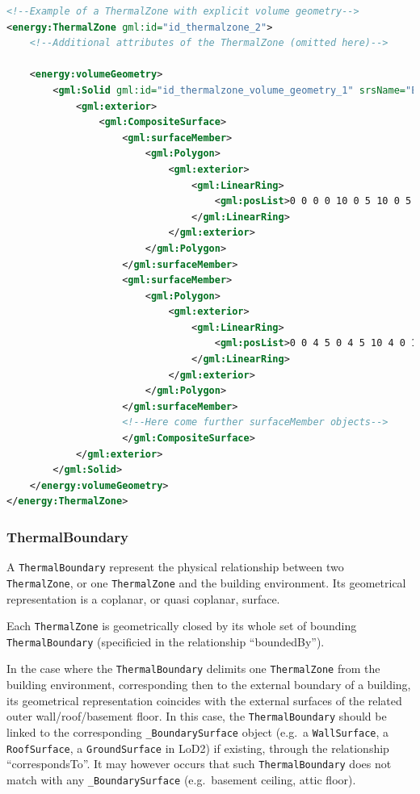 \documentclass[a4paper,12pt]{article}
\begin{document}
\begin{lstlisting}[language=XML]
<!--Example of a ThermalZone with explicit volume geometry-->
<energy:ThermalZone gml:id="id_thermalzone_2">
    <!--Additional attributes of the ThermalZone (omitted here)-->

    <energy:volumeGeometry>
        <gml:Solid gml:id="id_thermalzone_volume_geometry_1" srsName="EPSG:31256" srsDimension="3">
            <gml:exterior>
                <gml:CompositeSurface>
                    <gml:surfaceMember>
                        <gml:Polygon>
                            <gml:exterior>
                                <gml:LinearRing>
                                    <gml:posList>0 0 0 0 10 0 5 10 0 5 0 0 0 0 0</gml:posList>
                                </gml:LinearRing>
                            </gml:exterior>
                        </gml:Polygon>
                    </gml:surfaceMember>
                    <gml:surfaceMember>
                        <gml:Polygon>
                            <gml:exterior>
                                <gml:LinearRing>
                                    <gml:posList>0 0 4 5 0 4 5 10 4 0 10 4 0 0 4</gml:posList>
                                </gml:LinearRing>
                            </gml:exterior>
                        </gml:Polygon>
                    </gml:surfaceMember>
                    <!--Here come further surfaceMember objects-->
                    </gml:CompositeSurface>
            </gml:exterior>
        </gml:Solid>
    </energy:volumeGeometry>
</energy:ThermalZone>
\end{lstlisting}

\subsubsection{ThermalBoundary}\label{thermalboundary}

A \lstinline!ThermalBoundary! represent the physical relationship
between two \lstinline!ThermalZone!, or one \lstinline!ThermalZone! and
the building environment. Its geometrical representation is a coplanar,
or quasi coplanar, surface.

Each \lstinline!ThermalZone! is geometrically closed by its whole set of
bounding \lstinline!ThermalBoundary! (specificied in the relationship
``boundedBy'').

In the case where the \lstinline!ThermalBoundary! delimits one
\lstinline!ThermalZone! from the building environment, corresponding
then to the external boundary of a building, its geometrical
representation coincides with the external surfaces of the related outer
wall/roof/basement floor. In this case, the \lstinline!ThermalBoundary!
should be linked to the corresponding \lstinline!_BoundarySurface!
object (e.g.~a \lstinline!WallSurface!, a \lstinline!RoofSurface!, a
\lstinline!GroundSurface! in LoD2) if existing, through the relationship
``correspondsTo''. It may however occurs that such
\lstinline!ThermalBoundary! does not match with any
\lstinline!_BoundarySurface! (e.g.~basement ceiling, attic floor).
\end{document}
